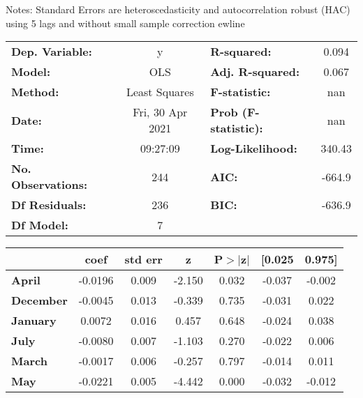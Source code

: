 Notes: \newline
 [1] Standard Errors are heteroscedasticity and autocorrelation robust (HAC) using 5 lags and without small sample correction
ewline\begin{center}
\begin{tabular}{lclc}
\toprule
\textbf{Dep. Variable:}    &        y         & \textbf{  R-squared:         } &     0.094   \\
\textbf{Model:}            &       OLS        & \textbf{  Adj. R-squared:    } &     0.067   \\
\textbf{Method:}           &  Least Squares   & \textbf{  F-statistic:       } &       nan   \\
\textbf{Date:}             & Fri, 30 Apr 2021 & \textbf{  Prob (F-statistic):} &      nan    \\
\textbf{Time:}             &     09:27:09     & \textbf{  Log-Likelihood:    } &    340.43   \\
\textbf{No. Observations:} &         244      & \textbf{  AIC:               } &    -664.9   \\
\textbf{Df Residuals:}     &         236      & \textbf{  BIC:               } &    -636.9   \\
\textbf{Df Model:}         &           7      & \textbf{                     } &             \\
\bottomrule
\end{tabular}
\begin{tabular}{lcccccc}
                   & \textbf{coef} & \textbf{std err} & \textbf{z} & \textbf{P$> |$z$|$} & \textbf{[0.025} & \textbf{0.975]}  \\
\midrule
\textbf{April}     &      -0.0196  &        0.009     &    -2.150  &         0.032        &       -0.037    &       -0.002     \\
\textbf{December}  &      -0.0045  &        0.013     &    -0.339  &         0.735        &       -0.031    &        0.022     \\
\textbf{January}   &       0.0072  &        0.016     &     0.457  &         0.648        &       -0.024    &        0.038     \\
\textbf{July}      &      -0.0080  &        0.007     &    -1.103  &         0.270        &       -0.022    &        0.006     \\
\textbf{March}     &      -0.0017  &        0.006     &    -0.257  &         0.797        &       -0.014    &        0.011     \\
\textbf{May}       &      -0.0221  &        0.005     &    -4.442  &         0.000        &       -0.032    &       -0.012     \\

\end{tabular}
\end{center}
